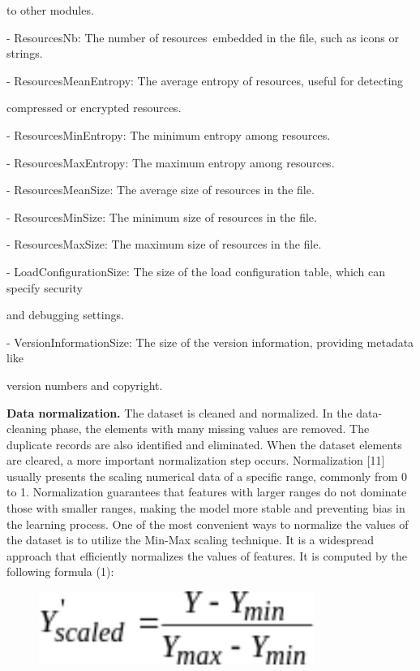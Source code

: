 \begin{multicols}{2}
to other modules.

- ResourcesNb: The number of resources~embedded in the file, such as
icons or strings.

- ResourcesMeanEntropy: The average entropy of resources, useful for
detecting

compressed or encrypted resources.

- ResourcesMinEntropy: The minimum entropy among resources.

- ResourcesMaxEntropy: The maximum entropy among resources.

- ResourcesMeanSize: The average size of resources in the file.

- ResourcesMinSize: The minimum size of resources in the file.

- ResourcesMaxSize: The maximum size of resources in the file.

- LoadConfigurationSize: The size of the load configuration table, which
can specify security

and debugging settings.

- VersionInformationSize: The size of the version information, providing
metadata like

version numbers and copyright.

{\bfseries Data normalization.} The dataset is cleaned and normalized. In
the data-cleaning phase, the elements with many missing values are
removed. The duplicate records are also identified and eliminated. When
the dataset elements are cleared, a more important normalization step
occurs. Normalization {[}11{]} usually presents the scaling numerical
data of a specific range, commonly from 0 to 1. Normalization guarantees
that features with larger ranges do not dominate those with smaller
ranges, making the model more stable and preventing bias in the learning
process. One of the most convenient ways to normalize the values of the
dataset is to utilize the Min-Max scaling technique. It is a widespread
approach that efficiently normalizes the values of features. It is
computed by the following formula (1):
\end{multicols}

\begin{figure}[H]
	\centering
	\includegraphics[width=0.8\textwidth]{media/ict/image28}
	\caption*{}
\end{figure}


